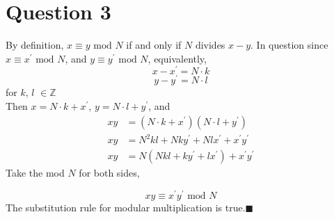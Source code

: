 \documentclass{article}
\begin{document}
    

\section{Question 3}
By definition, $x \equiv y \mbox{ mod } N $ if and only if $N$ divides $x-y$.
In question since $x \equiv x^\prime \mbox{ mod } N$, and $y \equiv y^\prime \mbox{ mod } N $, equivalently,
$$x - x^\prime = N \cdot k$$
$$y - y^\prime = N \cdot l$$
for $k$, $l$ $\in \mathbb{Z}$
\\
Then $x = N \cdot k + x^\prime$, $y = N \cdot l + y^\prime$, and 
\begin{align}
    xy &= (N \cdot k + x^\prime) (N \cdot l + y^\prime) \nonumber \\
xy &= N^2 k l + Nk y^\prime + Nlx^\prime + x^\prime y^\prime \nonumber \\
xy &= N(Nkl + k y^\prime + lx^\prime) + x^\prime y^\prime \nonumber
\end{align}
Take the mod $N$ for both sides,

$$xy \equiv x^\prime y^\prime \mbox{ mod } N $$
The substitution rule for modular multiplication is true.$\blacksquare$


    
\end{document}
